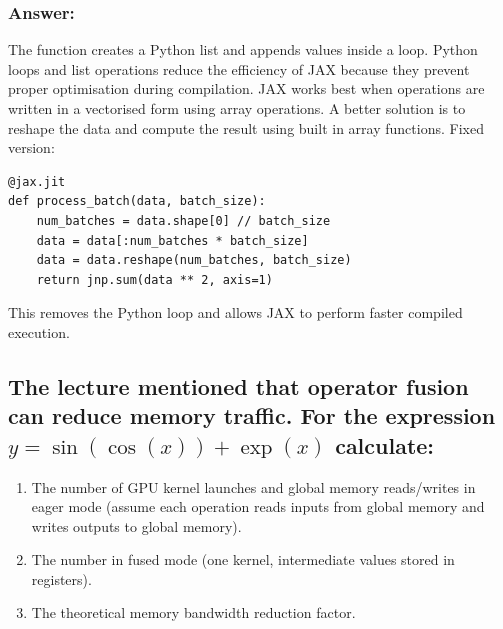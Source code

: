 \documentclass{article}
\begin{document}
\subsubsection*{Answer:}
The function creates a Python list and appends values inside a loop. 
Python loops and list operations reduce the efficiency of JAX because they prevent proper optimisation during compilation.
JAX works best when operations are written in a vectorised form using array operations. 
A better solution is to reshape the data and compute the result using built in array functions.
Fixed version:
\begin{lstlisting}[style=py]
@jax.jit
def process_batch(data, batch_size):
    num_batches = data.shape[0] // batch_size
    data = data[:num_batches * batch_size]
    data = data.reshape(num_batches, batch_size)
    return jnp.sum(data ** 2, axis=1)
\end{lstlisting}
This removes the Python loop and allows JAX to perform faster compiled execution.

\subsection{The lecture mentioned that operator fusion can reduce memory traffic. 
For the expression $y = \sin(\cos(x)) + \exp(x)$ calculate:}

\begin{enumerate}
\item[(a)] The number of GPU kernel launches and global memory
reads/writes in eager mode (assume each operation reads inputs from
global memory and writes outputs to global memory).

\item[(b)] The number in fused mode (one kernel, intermediate values
stored in registers).

\item[(c)] The theoretical memory bandwidth reduction factor.
\end{enumerate}
\end{document}
